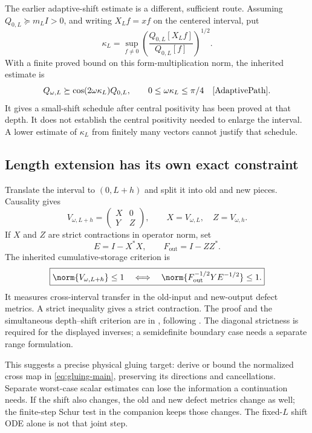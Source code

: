 The earlier adaptive-shift estimate is a different, sufficient
route. Assuming $Q_{0,L}\succeq m_LI>0$, and writing $X_Lf=xf$
on the centered interval, put
\begin{equation}
 \kappa_L=\sup_{f\ne0}
       \left(\frac{Q_{0,L}[X_Lf]}{Q_{0,L}[f]}\right)^{1/2}.
\end{equation}
With a finite proved bound on this form-multiplication norm, the
inherited estimate is
\begin{equation}
 Q_{\omega,L}\succeq
 \cos(2\omega\kappa_L)Q_{0,L},
 \qquad 0\leq\omega\kappa_L\leq\pi/4
 \quad\cite{AdaptivePath}.
\end{equation}
It gives a small-shift schedule after central positivity has
been proved at that depth. It does not establish the central
positivity needed to enlarge the interval. A lower estimate of
$\kappa_L$ from finitely many vectors cannot justify that schedule.

\subsection{Length extension has its own exact constraint}

Translate the interval to $(0,L+h)$ and split it into old and
new pieces. Causality gives
\begin{equation}
 V_{\omega,L+h}=
 \begin{pmatrix}X&0\\Y&Z\end{pmatrix},
 \qquad X=V_{\omega,L},\quad Z=V_{\omega,h}.
\end{equation}
If $X$ and $Z$ are strict contractions in operator norm, set
\[
 E=I-X^*X,\qquad F_{\mathrm{out}}=I-ZZ^*.
\]
The inherited cumulative-storage criterion is
\begin{equation}\label{eq:gluing-main}
 \boxed{\norm{V_{\omega,L+h}}\leq1
 \quad\Longleftrightarrow\quad
 \norm{F_{\mathrm{out}}^{-1/2}YE^{-1/2}}\leq1.}
\end{equation}
It measures cross-interval transfer in the old-input and new-output
defect metrics. A strict inequality gives a strict contraction.
The proof and the simultaneous depth--shift criterion are in
\cite[Section~S9]{Supplement}, following \cite{CumulativePath}.
The diagonal strictness is required for the displayed inverses;
a semidefinite boundary case needs a separate range formulation.

This suggests a precise physical gluing target: derive or bound
the normalized cross map in \eqref{eq:gluing-main}, preserving its
directions and cancellations. Separate worst-case scalar estimates
can lose the information a continuation needs.
If the shift also changes, the old and new defect metrics change
as well; the finite-step Schur test in the companion keeps those
changes. The fixed-$L$ shift ODE alone is not that joint step.


